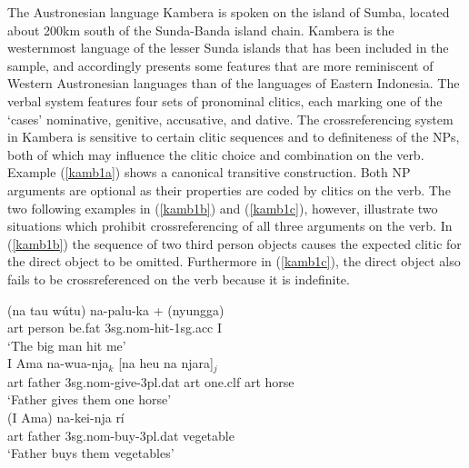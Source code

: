 The Austronesian language Kambera is spoken on the island of Sumba, located about 200km south of the Sunda-Banda island chain. Kambera is the westernmost language of the lesser Sunda islands that has been included in the sample, and accordingly presents some features that are more reminiscent of Western Austronesian languages than of the languages of Eastern Indonesia. The verbal system features four sets of pronominal clitics, each marking one of the `cases' nominative, genitive, accusative, and dative. The crossreferencing system in Kambera is sensitive to certain clitic sequences and to definiteness of the NPs, both of which may influence the clitic choice and combination on the verb. Example (\ref{kamb1a}) shows a canonical transitive construction. Both NP arguments are optional as their properties are coded by clitics on the verb. The two following examples in (\ref{kamb1b}) and (\ref{kamb1c}), however, illustrate two situations which prohibit crossreferencing of all three arguments on the verb. In (\ref{kamb1b}) the sequence of two third person objects causes the expected clitic for the direct object to be omitted. Furthermore in (\ref{kamb1c}), the direct object also fails to be crossreferenced on the verb because it is indefinite.

\pex 
\a \label{kamb1a}
\gll (na tau wútu) na-palu-ka + (nyungga) \\
\acs{art} person be.fat \acs{3}\acs{sg}.\acs{nom}-hit-\acs{1}\acs{sg}.\acs{acc} I \\
\glft `The big man hit me' \\ 
\endgl
\a \label{kamb1b}
\gla I Ama na-wua-nja$_k$ [na heu na njara]$_j$ \\
\acs{art} father \acs{3}\acs{sg}.\acs{nom}-give-\acs{3}\acs{pl}.\acs{dat} \acs{art} one.\acs{clf} \acs{art} horse \\
\glft `Father gives them one horse' \\ 
\endgl
\a \label{kamb1c}
\gla (I Ama) na-kei-nja rí \\ 
\acs{art} father \acs{3}\acs{sg}.\acs{nom}-buy-\acs{3}\acs{pl}.\acs{dat} vegetable \\
\glft `Father buys them vegetables' \\ 
\endgl
\xe

